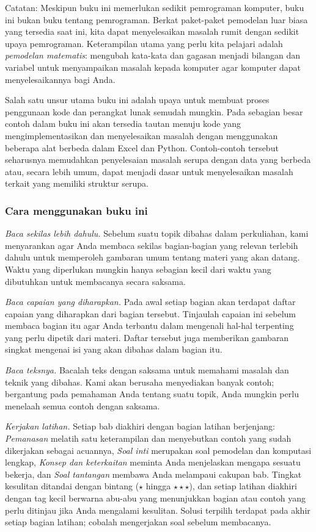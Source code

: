 Catatan: Meskipun buku ini memerlukan sedikit pemrograman komputer, buku ini bukan buku tentang pemrograman.   Berkat paket-paket pemodelan luar biasa yang tersedia saat ini, kita dapat menyelesaikan masalah rumit dengan sedikit upaya pemrograman.   Keterampilan utama yang perlu kita pelajari adalah \emph{pemodelan matematis}: mengubah kata-kata dan gagasan menjadi bilangan dan variabel untuk menyampaikan masalah kepada komputer agar komputer dapat menyelesaikannya bagi Anda.  

Salah satu unsur utama buku ini adalah upaya untuk membuat proses penggunaan kode dan perangkat lunak semudah mungkin.  Pada sebagian besar contoh dalam buku ini akan tersedia tautan menuju kode yang mengimplementasikan dan menyelesaikan masalah dengan menggunakan beberapa alat berbeda dalam Excel dan Python.  Contoh-contoh tersebut seharusnya memudahkan penyelesaian masalah serupa dengan data yang berbeda atau, secara lebih umum, dapat menjadi dasar untuk menyelesaikan masalah terkait yang memiliki struktur serupa.

\subsubsection*{Cara menggunakan buku ini}

\emph{Baca sekilas lebih dahulu.} Sebelum suatu topik dibahas dalam perkuliahan, kami menyarankan agar Anda membaca sekilas bagian-bagian yang relevan terlebih dahulu untuk memperoleh gambaran umum tentang materi yang akan datang.   Waktu yang diperlukan mungkin hanya sebagian kecil dari waktu yang dibutuhkan untuk membacanya secara saksama.

\emph{Baca capaian yang diharapkan.} Pada awal setiap bagian akan terdapat daftar capaian yang diharapkan dari bagian tersebut.  Tinjaulah capaian ini sebelum membaca bagian itu agar Anda terbantu dalam mengenali hal-hal terpenting yang perlu dipetik dari materi.  Daftar tersebut juga memberikan gambaran singkat mengenai isi yang akan dibahas dalam bagian itu.

\emph{Baca teksnya.} Bacalah teks dengan saksama untuk memahami masalah dan teknik yang dibahas.  Kami akan berusaha menyediakan banyak contoh; bergantung pada pemahaman Anda tentang suatu topik, Anda mungkin perlu menelaah semua contoh dengan saksama.

\emph{Kerjakan latihan.} Setiap bab diakhiri dengan bagian latihan berjenjang: \emph{Pemanasan} melatih satu keterampilan dan menyebutkan contoh yang sudah dikerjakan sebagai acuannya, \emph{Soal inti} merupakan soal pemodelan dan komputasi lengkap, \emph{Konsep dan keterkaitan} meminta Anda menjelaskan mengapa sesuatu bekerja, dan \emph{Soal tantangan} membawa Anda melampaui cakupan bab. Tingkat kesulitan ditandai dengan bintang ($\star$ hingga $\star\star\star$), dan setiap latihan diakhiri dengan tag kecil berwarna abu-abu yang menunjukkan bagian atau contoh yang perlu ditinjau jika Anda mengalami kesulitan. Solusi terpilih terdapat pada akhir setiap bagian latihan; cobalah mengerjakan soal sebelum membacanya.

